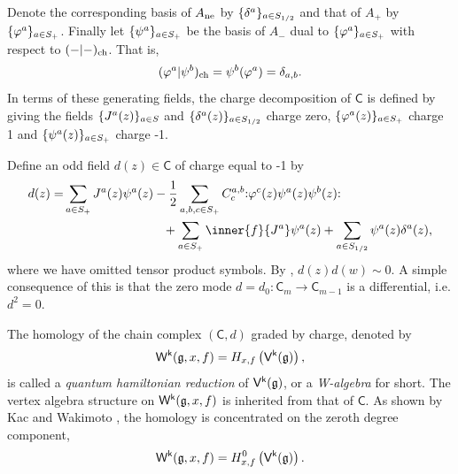 \documentclass[10pt,a4paper]{amsart}
\numberwithin{equation}{section}
\newcommand{\kk}{\mathsf{k}}   %
\DeclarePairedDelimiter{\brac}{\lparen}{\rparen}   %
\DeclarePairedDelimiter{\set}{\lbrace}{\rbrace}
\newcommand{\no}[1]{\mathopen{:} #1 \mathclose{:}} %
\newcommand{\blank}{{-}}
\newcommand{\VOA}[1]{\mathsf{#1}}    %
\newcommand{\Wsymb}{\VOA{W}}
\newcommand{\uaffvoa}[2]{\VOA{V}^{#1}\brac{#2}}                   %
\newcommand{\uQHR}[3]{\Wsymb^{#1}\brac{#2,#3}}                    %
\theoremstyle{plain}
\begin{document}
Denote the corresponding basis of $A_{\textup{ne}}$ by $\set{\delta^a}_{a \in S_{1/2}}$ and that of $A_+$ by $\set{\varphi^a}_{a \in S_+}$. Finally let $\set{\psi^a}_{a \in S_+}$ be the basis of $A_-$ dual to $\set{\varphi^a}_{a \in S_+}$ with respect to $(\blank | \blank)_{\textup{ch}}$. That is,
%
\begin{equation}
    (\varphi^a| \psi^b)_{\textup{ch}} = \psi^b(\varphi^a) = \delta_{a,b}.
\end{equation}
%
In terms of these generating fields, the charge decomposition of $\VOA{C}$ is defined by giving the fields $\set{J^a(z)}_{a \in S}$ and $\set{\delta^a(z)}_{a \in S_{1/2}}$ charge zero, $\set{\varphi^a(z)}_{a \in S_+}$ charge 1 and $\set{\psi^a(z)}_{a \in S_+}$ charge -1.

Define an odd field $d(z) \in \VOA{C}$ of charge equal to -1 by
%
\begin{align} \label{eq:differential}
    d(z) =& \sum_{a \in S_+} J^a(z) \psi^a(z) -\frac{1}{2}\sum_{a,b,c \in S_+} C^{a,b}_c \no{\varphi^c(z) \psi^a(z) \psi^b(z)}\\
          &\hspace{80pt}+ \sum_{a \in S_+} \inner{f}{J^a}\psi^a(z) + \sum_{a \in S_{1/2}}\psi^a(z) \delta^a(z), \notag
\end{align}
%
where we have omitted tensor product symbols. By \cite[Thm.~2.1]{KacQua03}, $d(z)d(w) \sim 0$. A simple consequence of this is that the zero mode $d=d_0: \VOA{C}_m \rightarrow \VOA{C}_{m-1}$ is a differential, i.e. $d^2 = 0$. 

The homology of the chain complex $(\mathsf{C},d)$ graded by charge, denoted by 
\begin{equation}
    \uQHR{\kk}{\mathfrak{g}}{x,f} =  H_{x,f}\left(\uaffvoa{\kk}{\mathfrak{g}} \right),
\end{equation}
%
is called a \emph{quantum hamiltonian reduction} of $\uaffvoa{\kk}{\mathfrak{g}}$, or a \emph{W-algebra} for short. The vertex algebra structure on $\uQHR{\kk}{\mathfrak{g}}{x,f}$ is inherited from that of $\VOA{C}$. As shown by Kac and Wakimoto \cite[Thm.~4.1]{KacQua03}, the homology is concentrated on the zeroth degree component,
%
\begin{equation}
    \uQHR{\kk}{\mathfrak{g}}{x,f} =  H_{x,f}^0 \left(\uaffvoa{\kk}{\mathfrak{g}} \right).
\end{equation}
\end{document}
